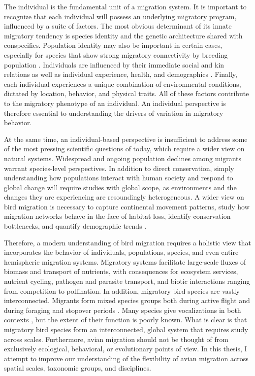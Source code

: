 \documentclass[a4paper, nobind]{templates/ociamthesis}
\begin{document}
The individual is the fundamental unit of a migration system. It is important to recognize that each individual will possess an underlying migratory program, influenced by a suite of factors. The most obvious determinant of its innate migratory tendency is species identity and the genetic architecture shared with conspecifics. Population identity may also be important in certain cases, especially for species that show strong migratory connectivity by breeding population \autocite[see][]{websterLinksWorldsUnraveling2002}. Individuals are influenced by their immediate social and kin relations as well as individual experience, health, and demographics \autocite{newtonMigrationEcologyBirds2008,briedisMigratoryConnectivityContext2018}. Finally, each individual experiences a unique combination of environmental conditions, dictated by location, behavior, and physical traits. All of these factors contribute to the migratory phenotype of an individual. An individual perspective is therefore essential to understanding the drivers of variation in migratory behavior.

At the same time, an individual-based perspective is insufficient to address some of the most pressing scientific questions of today, which require a wider view on natural systems. Widespread and ongoing population declines among migrants warrant species-level perspectives. In addition to direct conservation, simply understanding how populations interact with human society and respond to global change will require studies with global scope, as environments and the changes they are experiencing are resoundingly heterogeneous. A wider view on bird migration is necessary to capture continental movement patterns, study how migration networks behave in the face of habitat loss, identify conservation bottlenecks, and quantify demographic trends \autocite[see][]{dokterSeasonalAbundanceSurvival2018}.

Therefore, a modern understanding of bird migration requires a holistic view that incorporates the behavior of individuals, populations, species, and even entire hemispheric migration systems. Migratory systems facilitate large-scale fluxes of biomass and transport of nutrients, with consequences for ecosystem services, nutrient cycling, pathogen and parasite transport, and biotic interactions ranging from competition to pollination. In addition, migratory bird species are vastly interconnected. Migrants form mixed species groups both during active flight \autocite{larkinEvidenceWidelyDispersed2008} and during foraging and stopover periods \autocite{rodewaldHabitatUseBehavior2002}. Many species give vocalizations in both contexts \autocite{farnsworthFlightCallsTheir2005}, but the extent of their function is poorly known. What is clear is that migratory bird species form an interconnected, global system that requires study across scales. Furthermore, avian migration should not be thought of from exclusively ecological, behavioral, or evolutionary points of view. In this thesis, I attempt to improve our understanding of the flexibility of avian migration across spatial scales, taxonomic groups, and disciplines.
\end{document}
